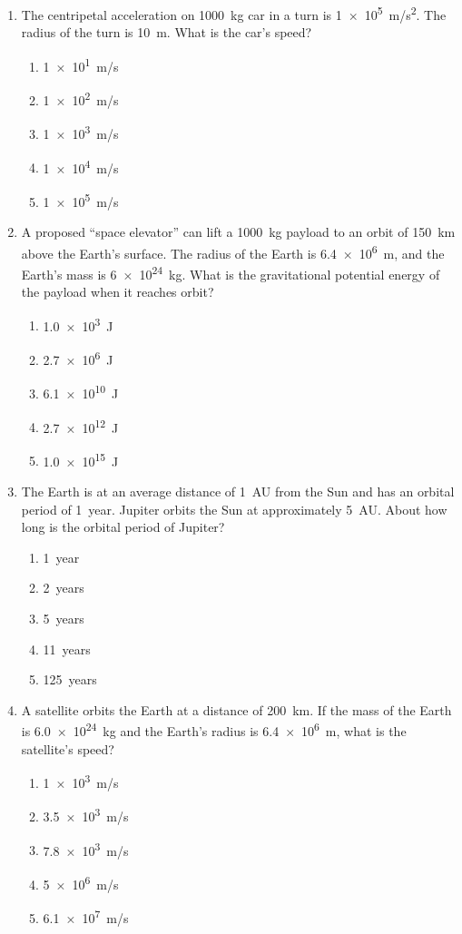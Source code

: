 \documentclass{../../oss-apphys}
\begin{document}
\begin{multicols}{2}
\begin{enumerate}[leftmargin=18pt,start=8]
  \item The centripetal acceleration on \SI{1000}{kg} car in a turn is
    \SI{1e5}{m/s^2}. The radius of the turn is \SI{10}{m}. What is the car's
    speed?
    \begin{enumerate}[noitemsep,topsep=0pt,leftmargin=18pt]
    \item\SI{1e1}{m/s}
    \item\SI{1e2}{m/s}
    \item\SI{1e3}{m/s}
    \item\SI{1e4}{m/s}
    \item\SI{1e5}{m/s}
    \end{enumerate}
  
  \item A proposed ``space elevator'' can lift a \SI{1000}{\kg} payload to an
    orbit of \SI{150}{\km} above the Earth's surface. The radius of the Earth is
    \SI{6.4e6}{\m}, and the Earth's mass is \SI{6e24}{\kg}. What is the
    gravitational potential energy of the payload when it reaches orbit?
    \begin{enumerate}[noitemsep,topsep=0pt,leftmargin=18pt]
    \item\SI{1.0e3}{J}
    \item\SI{2.7e6}{J}
    \item\SI{6.1e10}{J}
    \item\SI{2.7e12}{J}
    \item\SI{1.0e15}{J}
    \end{enumerate}

  \item The Earth is at an average distance of \SI{1}{AU} from the Sun and has
    an orbital period of \SI{1}{year}. Jupiter orbits the Sun at approximately
    \SI{5}{AU}. About how long is the orbital period of Jupiter?
    \begin{enumerate}[noitemsep,topsep=0pt,leftmargin=18pt]
    \item\SI{1}{year}
    \item\SI{2}{years}
    \item\SI{5}{years}
    \item\SI{11}{years}
    \item\SI{125}{years}
    \end{enumerate}

    \columnbreak
    
  \item A satellite orbits the Earth at a distance of \SI{200}{\km}. If the mass
    of the Earth is \SI{6.0e24}{\kg} and the Earth's radius is \SI{6.4e6}{\m},
    what is the satellite's speed?
    \begin{enumerate}[noitemsep,topsep=0pt,leftmargin=18pt]
    \item\SI{1e3}{m/s}
    \item\SI{3.5e3}{m/s}
    \item\SI{7.8e3}{m/s}
    \item\SI{5e6}{m/s}
    \item\SI{6.1e7}{m/s}
    \end{enumerate}
  

\end{enumerate}
\end{multicols}
\end{document}
